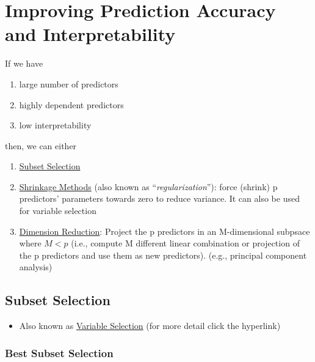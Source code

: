 \documentclass[
]{book}
\providecommand{\tightlist}{%
  \setlength{\itemsep}{0pt}\setlength{\parskip}{0pt}}
\begin{document}
\hypertarget{improving-prediction-accuracy-and-interpretability}{%
\section{Improving Prediction Accuracy and Interpretability}\label{improving-prediction-accuracy-and-interpretability}}

If we have

\begin{enumerate}
\def\labelenumi{\arabic{enumi}.}
\tightlist
\item
  large number of predictors
\item
  highly dependent predictors
\item
  low interpretability
\end{enumerate}

then, we can either

\begin{enumerate}
\def\labelenumi{\arabic{enumi}.}
\item
  \protect\hyperlink{subset-selection}{Subset Selection}
\item
  \protect\hyperlink{shrinkage-methods}{Shrinkage Methods} (also known as ``\emph{regularization}''): force (shrink) p predictors' parameters towards zero to reduce variance. It can also be used for variable selection
\item
  \protect\hyperlink{dimension-reduction-1}{Dimension Reduction}: Project the p predictors in an M-dimensional subpsace where \(M <p\) (i.e., compute M different linear combination or projection of the p predictors and use them as new predictors). (e.g., principal component analysis)
\end{enumerate}

\hypertarget{subset-selection}{%
\subsection{Subset Selection}\label{subset-selection}}

\begin{itemize}
\tightlist
\item
  Also known as \href{https://bookdown.org/mike/data_analysis/ordinary-least-squares.html\#variable-selection}{Variable Selection} (for more detail click the hyperlink)
\end{itemize}

\hypertarget{best-subset-selection}{%
\subsubsection{Best Subset Selection}\label{best-subset-selection}}
\end{document}
